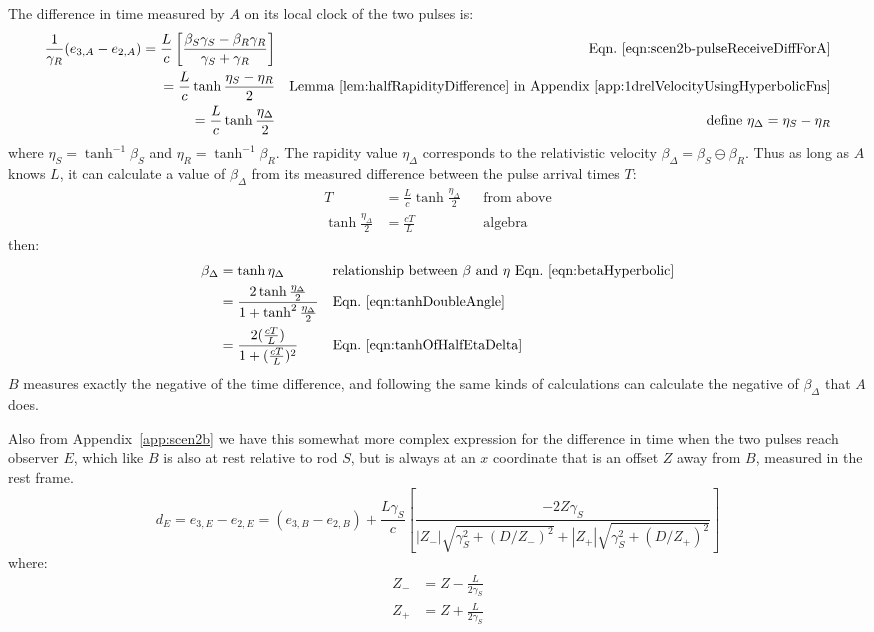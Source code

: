 \documentclass[a4paper]{article}
\theoremstyle{plain}
\theoremstyle{definition}
\begin{document}
The difference in time measured by $A$ on its local clock of the two
pulses is:
\begin{align*}
\frac{1}{\gamma_R} (e_{3,A}-e_{2,A})
  = \frac{L}{c} \left[ \frac{\beta_S\gamma_S - \beta_R\gamma_R}{\gamma_S + \gamma_R} \right] & & \text{Eqn.~\eqref{eqn:scen2b-pulseReceiveDiffForA}} \\
  = \frac{L}{c} \tanh \frac{\eta_S-\eta_R}{2} & & \text{Lemma~\ref{lem:halfRapidityDifference} in Appendix~\ref{app:1drelVelocityUsingHyperbolicFns}} \\
  = \frac{L}{c} \tanh \frac{\eta_{\Delta}}{2} & & \text{define $\eta_{\Delta}=\eta_S-\eta_R$}
\end{align*}
where $\eta_S = \tanh^{-1} \beta_S$ and $\eta_R = \tanh^{-1} \beta_R$.
The rapidity value $\eta_{\Delta}$ corresponds to the relativistic
velocity $\beta_{\Delta} = \beta_S \ominus \beta_R$.  Thus as long as
$A$ knows $L$, it can calculate a value of $\beta_{\Delta}$ from
its measured difference between the pulse arrival times $T$:
\begin{align}
T & = \frac{L}{c} \tanh \frac{\eta_{\Delta}}{2} & & \text{from above} \nonumber \\
\tanh \frac{\eta_{\Delta}}{2} & = \frac{cT}{L} & & \text{algebra} \label{eqn:tanhOfHalfEtaDelta}
\end{align}
then:
\begin{align*}
\beta_{\Delta}
  & = \tanh \eta_{\Delta} & & \text{relationship between $\beta$ and $\eta$ Eqn.~\eqref{eqn:betaHyperbolic}} \\
  & = \frac{2\tanh \frac{\eta_{\Delta}}{2}}{1+\tanh^2 \frac{\eta_{\Delta}}{2}} & & \text{Eqn.~\eqref{eqn:tanhDoubleAngle}} \\
  & = \frac{2 (\frac{cT}{L})}{1+(\frac{cT}{L})^2} & & \text{Eqn.~\eqref{eqn:tanhOfHalfEtaDelta}} \\
\end{align*}
$B$ measures exactly the negative of the time difference, and
following the same kinds of calculations can calculate the negative of
$\beta_{\Delta}$ that $A$ does.

Also from Appendix~\ref{app:scen2b} we have this somewhat more complex
expression for the difference in time when the two pulses reach
observer $E$, which like $B$ is also at rest relative to rod $S$, but
is always at an $x$ coordinate that is an offset $Z$ away from $B$,
measured in the rest frame.
\begin{equation}
d_E
  = e_{3,E}-e_{2,E}
  = (e_{3,B}-e_{2,B}) +
  \frac{L\gamma_S}{c} \left[ \frac{-2Z\gamma_S}{|Z_{-}| \sqrt{ \gamma_S^2 + (D/Z_{-})^2 } + |Z_{+}| \sqrt{ \gamma_S^2 + (D/Z_{+})^2 }} \right] \label{eqn:scen2b-observerE-finalstep}
\end{equation}
where:
\begin{align*}
Z_{-} & = Z - \frac{L}{2\gamma_S} \\
Z_{+} & = Z + \frac{L}{2\gamma_S}
\end{align*}
\end{document}
